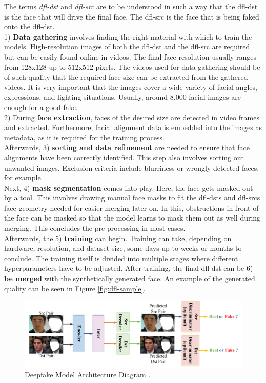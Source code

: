 \documentclass[
  a4paper,  %
  twoside,  %
  bibliography=totoc,
  headsepline,
  cleardoublepage=empty,
  parskip=half,
  draft=false
]{scrbook}
\begin{document}
The terms \textit{\gls{dfl-dst}} and \textit{\gls{dfl-src}} are to be understood in such a way that the \gls{dfl-dst} is the face that will drive the final face. The \gls{dfl-src} is the face that is being faked onto the \gls{dfl-dst}. \\
1) \textbf{Data gathering} involves finding the right material with which to train the models. High-resolution images of both the \gls{dfl-dst} and the \gls{dfl-src} are required but can be easily found online in videos. The final face resolution usually ranges from 128x128 up to 512x512 pixels. The videos used for data gathering should be of such quality that the required face size can be extracted from the gathered videos. It is very important that the images cover a wide variety of facial angles, expressions, and lighting situations. Usually, around 8.000 facial images are enough for a good fake. \\
2) During \textbf{face extraction}, faces of the desired size are detected in video frames and extracted. Furthermore, facial alignment data is embedded into the images as metadata, as it is required for the training process. \\
Afterwards, 3) \textbf{sorting and data refinement} are needed to ensure that face alignments have been correctly identified. This step also involves sorting out unwanted images. Exclusion criteria include blurriness or wrongly detected faces, for example. \\
Next, 4) \textbf{mask segmentation} comes into play. Here, the face gets masked out by a tool. This involves drawing manual face masks to fit the \gls{dfl-dst}s and \gls{dfl-src}s face geometry needed for easier merging later on. In this, obstructions in front of the face can be masked so that the model learns to mask them out as well during merging.  This concludes the pre-processing in most cases.\\
Afterwards, the 5) \textbf{training} can begin. Training can take, depending on hardware, resolution, and dataset size, some days up to weeks or months to conclude. The training itself is divided into multiple stages where different hyperparameters have to be adjusted. After training, the final \gls{dfl-dst} can be 6) \textbf{be merged} with the synthetically generated face. An example of the generated quality can be seen in Figure \ref{fig:dfl-sample}.

\begin{figure}[h]
  \centering
  \includegraphics[width=1\textwidth]{./graphics/df-model-arch.png}
  \caption{Deepfake Model Architecture Diagram \cite{perovDeepFaceLabIntegratedFlexible2021}.}
  \label{fig:df-model-diagram}
\end{figure}
\end{document}

